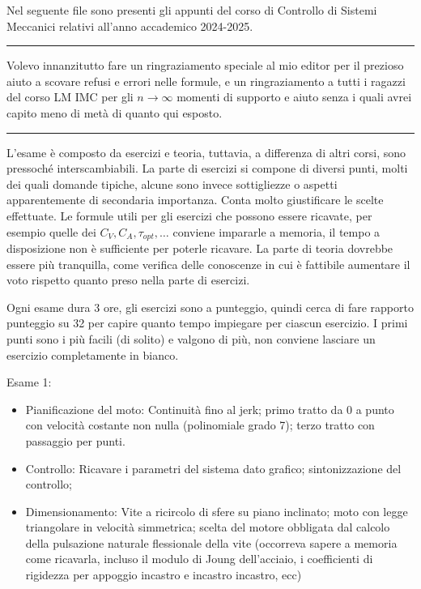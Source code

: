 \intro
Nel seguente file sono presenti gli appunti del corso di Controllo di Sistemi Meccanici relativi all'anno accademico 2024-2025.

\bigskip
\rule{\linewidth}{0.4pt}
\bigskip

Volevo innanzitutto fare un ringraziamento speciale al mio editor per il prezioso aiuto a scovare refusi e errori nelle formule, e un ringraziamento a tutti i ragazzi del corso LM IMC per gli \(n\rightarrow \infty\) momenti di supporto e aiuto senza i quali avrei capito meno di metà di quanto qui esposto.

\bigskip
\rule{\linewidth}{0.4pt}
\bigskip

L'esame è composto da esercizi e teoria, tuttavia, a differenza di altri corsi, sono pressoché interscambiabili.
La parte di esercizi si compone di diversi punti, molti dei quali domande tipiche, alcune sono invece sottigliezze o aspetti apparentemente di secondaria importanza. Conta molto giustificare le scelte effettuate.
Le formule utili per gli esercizi che possono essere ricavate, per esempio quelle dei \(C_V,C_A,\tau_{opt},\dots\) conviene impararle a memoria, il tempo a disposizione non è sufficiente per poterle ricavare.
La parte di teoria dovrebbe essere più tranquilla, come verifica delle conoscenze in cui è fattibile aumentare il voto rispetto quanto preso nella parte di esercizi.

Ogni esame dura 3 ore, gli esercizi sono a punteggio, quindi cerca di fare rapporto punteggio su 32 per capire quanto tempo impiegare per ciascun esercizio. I primi punti sono i più facili (di solito) e valgono di più, non conviene lasciare un esercizio completamente in bianco.

Esame 1:
\begin{itemize}
    \item Pianificazione del moto: Continuità fino al jerk; primo tratto da 0 a punto con velocità costante non nulla (polinomiale grado 7); terzo tratto con passaggio per punti.
    \item Controllo: Ricavare i parametri del sistema dato grafico; sintonizzazione del controllo;
    \item Dimensionamento: Vite a ricircolo di sfere su piano inclinato; moto con legge triangolare in velocità simmetrica; scelta del motore obbligata dal calcolo della pulsazione naturale flessionale della vite (occorreva sapere a memoria come ricavarla, incluso il modulo di Joung dell'acciaio, i coefficienti di rigidezza per appoggio incastro e incastro incastro, ecc)
\end{itemize}

